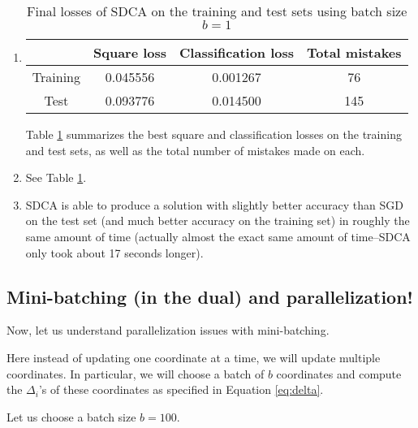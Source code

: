 \documentclass{article}
\begin{document}
\begin{enumerate}
	\newpage

	\item
	\begin{table}[h!]
		\centering
		\begin{tabular}{|c|c|c|c|}\hline
		     & {\bf Square loss} & {\bf Classification loss} & {\bf Total mistakes}  \\ \hline
		     Training	& 0.045556	& 0.001267	 & 76	\\ \hline
		     Test    	& 0.093776	& 0.014500	 & 145	\\ \hline
		\end{tabular}
		\caption{Final losses of SDCA on the training and test sets using batch size $b=1$}
		\label{tab:SDCA_final_loss_b1}
	\end{table}
	Table \ref{tab:SDCA_final_loss_b1} summarizes the best square and classification losses on the training and test sets, as well as the total number of mistakes made on each.

	\item See Table \ref{tab:SDCA_final_loss_b1}.

	\item SDCA is able to produce a solution with slightly better accuracy than SGD on the test set (and much better accuracy on the training set) in roughly the same amount of time (actually almost the exact same amount of time--SDCA only took about 17 seconds longer).
\end{enumerate}


\subsection{Mini-batching (in the dual) and parallelization!}
Now, let us understand parallelization issues with mini-batching. 

Here instead of updating one coordinate at a time, we will update multiple coordinates. In particular, we will choose a batch of  $b$ coordinates and compute the $\Delta_i$'s of these coordinates as specified in Equation \eqref{eq:delta}.
 
Let us choose a batch size $b=100$.
\end{document}
